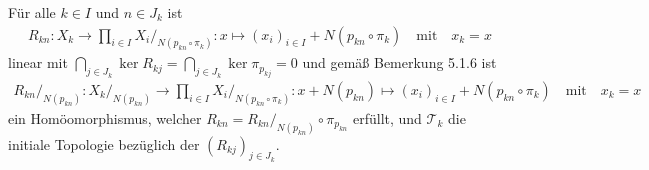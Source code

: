 \begin{solution}

Für alle $k \in I$ und $n \in J_k$ ist
\begin{align*}
    R_{kn}: X_k \to \prod_{i \in I} X_i /_{N(p_{kn} \circ \pi_k)}: x \mapsto (x_i)_{i \in I} + N(p_{kn} \circ \pi_k) \quad \textrm{mit} \quad x_k = x
\end{align*} 
linear mit $\bigcap_{j \in J_k} \ker R_{kj} = \bigcap_{j \in J_k} \ker \pi_{p_{kj}} = 0$ und gemäß Bemerkung 5.1.6 ist
\begin{align*}
    R_{kn}/_{N(p_{kn})}: X_k/_{N(p_{kn})} \to \prod_{i \in I} X_i /_{N(p_{kn} \circ \pi_k)}: x + N(p_{kn}) \mapsto (x_i)_{i \in I} + N(p_{kn} \circ \pi_k) \quad \textrm{mit} \quad x_k = x
\end{align*}
ein Homöomorphismus, welcher $R_{kn} = R_{kn}/_{N(p_{kn})} \circ \pi_{p_{kn}}$ erfüllt, und $\mathcal{T}_k$ die initiale Topologie bezüglich der $(R_{kj})_{j \in J_k}$.

\end{solution}

